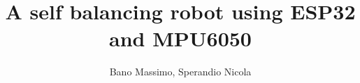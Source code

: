 \documentclass[12pt,a4paper,twoside,openright]{extreport}
\title{A self balancing robot using ESP32 and MPU6050}
\author{Bano Massimo, Sperandio Nicola}
\begin{document}
    \pagestyle{empty} %

    
    \cleardoublepage{}      %
    
    \begin{abstract}
        
    \end{abstract}
    \cleardoublepage{}

    \tableofcontents
    \cleardoublepage{}

    \pagestyle{plain} %
    
    
    \cleardoublepage{}

    
    \cleardoublepage{}

    
    \cleardoublepage{}

    
    \cleardoublepage{}

    
    \cleardoublepage{}

    
\end{document}

